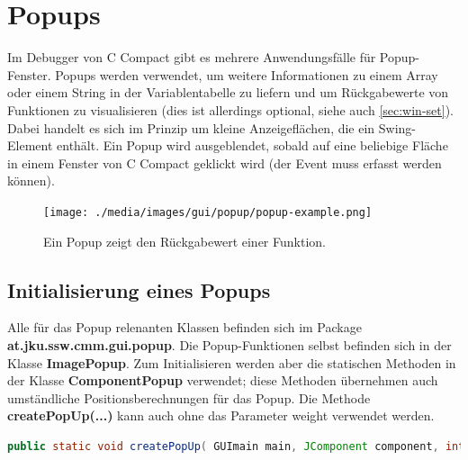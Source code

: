 


\section{Popups}
\label{sec:deb-popup}
Im Debugger von C Compact gibt es mehrere Anwendungsfälle für Popup-Fenster. Popups werden verwendet, um weitere Informationen zu einem Array oder einem String in der Variablentabelle zu liefern und um Rückgabewerte von Funktionen zu visualisieren (dies ist allerdings optional, siehe auch \ref{sec:win-set}). Dabei handelt es sich im Prinzip um kleine Anzeigeflächen, die ein Swing-Element enthält. Ein Popup wird ausgeblendet, sobald auf eine beliebige Fläche in einem Fenster von C Compact geklickt wird (der Event muss erfasst werden können).

\begin{figure}[htp]
\centering
\texttt{[image: ./media/images/gui/popup/popup-example.png]}
\caption{Ein Popup zeigt den Rückgabewert einer Funktion.}
\label{fig:popup-example}
\end{figure}

\subsection{Initialisierung eines Popups}
Alle für das Popup relenanten Klassen befinden sich im Package \textbf{at.jku.ssw.cmm.gui.popup}. Die Popup-Funktionen selbst befinden sich in der Klasse \textbf{ImagePopup}. Zum Initialisieren werden aber die statischen Methoden in der Klasse \textbf{ComponentPopup} verwendet; diese Methoden übernehmen auch umständliche Positionsberechnungen für das Popup. Die Methode \textbf{createPopUp(...)} kann auch ohne das Parameter \glqq{}weight\grqq{} verwendet werden.
\begin{lstlisting}[language=JAVA]
public static void createPopUp( GUImain main, JComponent component, int x, int y, int w, int h, int orientation, double weight );
\end{lstlisting}

